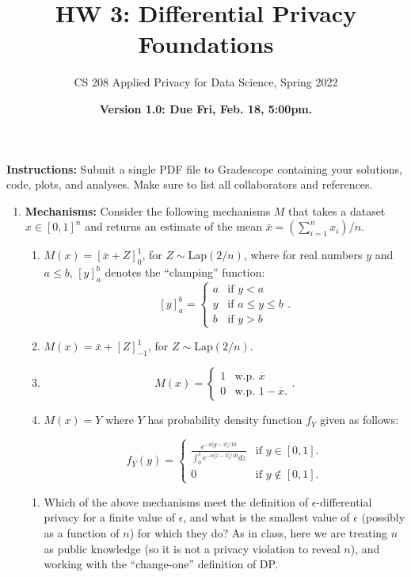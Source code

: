 \documentclass[11pt]{article}
\title{\vspace{-1.5cm} HW 3: Differential Privacy Foundations}
\author{CS 208 Applied Privacy for Data Science, Spring 2022}
\date{\textbf{Version 1.0: Due Fri, Feb. 18, 5:00pm.}}
\newcommand{\instructions}{\noindent \textbf{Instructions:} Submit a single PDF file to Gradescope containing your solutions, code, plots, and analyses. Make sure to list all collaborators and references.}
\theoremstyle{plain}
\theoremstyle{definition}
\theoremstyle{solution}
\begin{document}
    \maketitle

    \instructions

    \begin{enumerate}[leftmargin=*]

        \item \textbf{Mechanisms:} Consider the following mechanisms $M$ that takes a dataset $x\in [0,1]^n$ and returns
        an estimate of the mean $\bar{x} = (\sum_{i=1}^n x_i)/n$.

        \begin{enumerate}[label=\roman*]
            \item $M(x) = [\bar{x}+Z]^1_0$, for $Z\sim \mathrm{Lap}(2/n)$,
            where for real numbers $y$ and $a\leq b$, $[y]^b_a$ denotes the ``clamping'' function:
            $$[y]^b_a =
            \begin{cases}
                a & \text{if } y < a\\
                y & \text{if } a\leq y\leq b\\
                b & \text{if } y >b
            \end{cases}.$$
            \item $M(x) = \bar{x}+[Z]^1_{-1}$, for $Z\sim \mathrm{Lap}(2/n)$.
            \item
            $$M(x) = \begin{cases} 1 & \text{w.p. } \overline{x}\\
            0 & \text{w.p. } 1-\overline{x}.
            \end{cases}.$$
            \item $M(x) = Y$ where $Y$ has probability density function $f_Y$ given as follows:

            $$f_Y(y) = \begin{cases}
                           \frac{e^{-n|y-\bar{x}|/10}}{\int_0^1 e^{-n|z-\bar{x}|/10} dz} & \text{if } y\in [0,1].\\
                           0 & \text{if } y\notin [0,1].
            \end{cases}$$

        \end{enumerate}
        \begin{enumerate}
            \item Which of the above mechanisms meet the definition of $\epsilon$-differential privacy for a finite value of $\epsilon$, and what is the smallest value of $\epsilon$ (possibly as a function of $n$) for which they do? \label{part:epsilon}
            As in class, here we are treating $n$ as public knowledge (so it is not a privacy violation to reveal $n$), and working with the ``change-one'' definition of DP.


\end{enumerate}
\end{enumerate}
\end{document}
